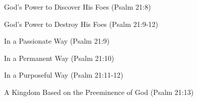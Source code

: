\begin{compactenum}[I.][7]
\begin{compactenum}[A.][2]
            \begin{compactenum}[1.]
                \item God's Power to Discover His Foes (Psalm 21:8)
                \item God's Power to Destroy His Foes  (Psalm 21:9-12)
                \begin{compactenum}[a.]
                    \item In a Passionate Way (Psalm 21:9) 
                    \item In a Permanent Way (Psalm 21:10) 
                    \item In a Purposeful Way (Psalm 21:11-12) 
                \end{compactenum}
            \end{compactenum}
        \item A Kingdom Based on the Preeminence of God (Psalm 21:13)
    \end{compactenum}
\end{compactenum} 

